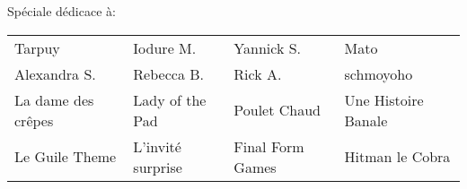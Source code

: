 {\vfill

Spéciale dédicace à: \\

\begin{tabular}{llll}
Tarpuy & Iodure M. & Yannick S. & Mato \\
Alexandra S. & Rebecca B. & Rick A. & schmoyoho \\
La dame des crêpes & Lady of the Pad & Poulet Chaud & Une Histoire Banale \\
Le Guile Theme & L'invité surprise & Final Form Games & Hitman le Cobra
\end{tabular}
}
